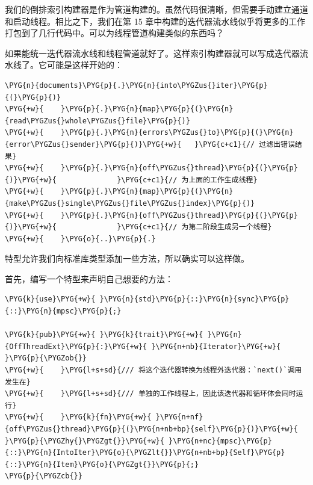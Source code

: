 我们的倒排索引构建器是作为管道构建的。虽然代码很清晰，但需要手动建立通道和启动线程。相比之下，我们在第 15 章中构建的迭代器流水线似乎将更多的工作打包到了几行代码中。可以为线程管道构建类似的东西吗？

如果能统一迭代器流水线和线程管道就好了。这样索引构建器就可以写成迭代器流水线了。它可能是这样开始的：

\begin{Verbatim}[commandchars=\\\{\},breaklines=true,breakanywhere=true,fontsize=\codefont,xleftmargin=17bp]
\PYG{n}{documents}\PYG{p}{.}\PYG{n}{into\PYGZus{}iter}\PYG{p}{(}\PYG{p}{)}
\PYG{+w}{    }\PYG{p}{.}\PYG{n}{map}\PYG{p}{(}\PYG{n}{read\PYGZus{}whole\PYGZus{}file}\PYG{p}{)}
\PYG{+w}{    }\PYG{p}{.}\PYG{n}{errors\PYGZus{}to}\PYG{p}{(}\PYG{n}{error\PYGZus{}sender}\PYG{p}{)}\PYG{+w}{   }\PYG{c+c1}{// 过滤出错误结果}
\PYG{+w}{    }\PYG{p}{.}\PYG{n}{off\PYGZus{}thread}\PYG{p}{(}\PYG{p}{)}\PYG{+w}{              }\PYG{c+c1}{// 为上面的工作生成线程}
\PYG{+w}{    }\PYG{p}{.}\PYG{n}{map}\PYG{p}{(}\PYG{n}{make\PYGZus{}single\PYGZus{}file\PYGZus{}index}\PYG{p}{)}
\PYG{+w}{    }\PYG{p}{.}\PYG{n}{off\PYGZus{}thread}\PYG{p}{(}\PYG{p}{)}\PYG{+w}{              }\PYG{c+c1}{// 为第二阶段生成另一个线程}
\PYG{+w}{    }\PYG{o}{..}\PYG{p}{.}
\end{Verbatim}

特型允许我们向标准库类型添加一些方法，所以确实可以这样做。

首先，编写一个特型来声明自己想要的方法：

\begin{Verbatim}[commandchars=\\\{\},breaklines=true,breakanywhere=true,fontsize=\codefont,xleftmargin=17bp]
\PYG{k}{use}\PYG{+w}{ }\PYG{n}{std}\PYG{p}{::}\PYG{n}{sync}\PYG{p}{::}\PYG{n}{mpsc}\PYG{p}{;}

\PYG{k}{pub}\PYG{+w}{ }\PYG{k}{trait}\PYG{+w}{ }\PYG{n}{OffThreadExt}\PYG{p}{:}\PYG{+w}{ }\PYG{n+nb}{Iterator}\PYG{+w}{ }\PYG{p}{\PYGZob{}}
\PYG{+w}{    }\PYG{l+s+sd}{/// 将这个迭代器转换为线程外迭代器：`next()`调用发生在}
\PYG{+w}{    }\PYG{l+s+sd}{/// 单独的工作线程上，因此该迭代器和循环体会同时运行}
\PYG{+w}{    }\PYG{k}{fn}\PYG{+w}{ }\PYG{n+nf}{off\PYGZus{}thread}\PYG{p}{(}\PYG{n+nb+bp}{self}\PYG{p}{)}\PYG{+w}{ }\PYG{p}{\PYGZhy{}\PYGZgt{}}\PYG{+w}{ }\PYG{n+nc}{mpsc}\PYG{p}{::}\PYG{n}{IntoIter}\PYG{o}{\PYGZlt{}}\PYG{n+nb+bp}{Self}\PYG{p}{::}\PYG{n}{Item}\PYG{o}{\PYGZgt{}}\PYG{p}{;}
\PYG{p}{\PYGZcb{}}
\end{Verbatim}

